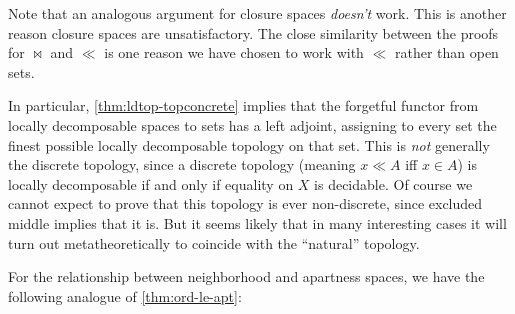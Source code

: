 \documentclass{article}
\begin{document}
Note that an analogous argument for closure spaces \emph{doesn't} work.
This is another reason closure spaces are unsatisfactory.
The close similarity between the proofs for $\bowtie$ and $\ll$ is one reason we have chosen to work with $\ll$ rather than open sets.

\begin{rmk}
  In particular, \cref{thm:ldtop-topconcrete} implies that the forgetful functor from locally decomposable spaces to sets has a left adjoint, assigning to every set the finest possible locally decomposable topology on that set.
  This is \emph{not} generally the discrete topology, since a discrete topology (meaning $x\ll A$ iff $x\in A$) is locally decomposable if and only if equality on $X$ is decidable.
  Of course we cannot expect to prove that this topology is ever non-discrete, since excluded middle implies that it is.
  But it seems likely that in many interesting cases it will turn out metatheoretically to coincide with the ``natural'' topology.
\end{rmk}

For the relationship between neighborhood and apartness spaces, we have the following analogue of \cref{thm:ord-le-apt}:
\end{document}
